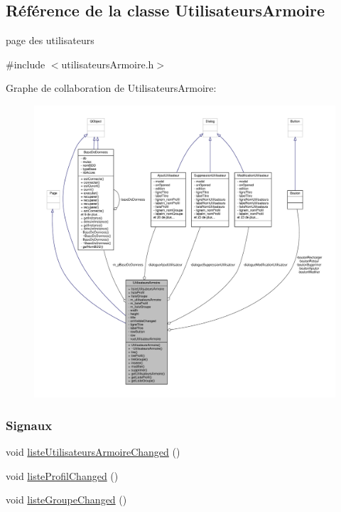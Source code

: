 \hypertarget{class_utilisateurs_armoire}{}\subsection{Référence de la classe Utilisateurs\+Armoire}
\label{class_utilisateurs_armoire}


page des utilisateurs  




{\ttfamily \#include $<$utilisateurs\+Armoire.\+h$>$}



Graphe de collaboration de Utilisateurs\+Armoire\+:\nopagebreak
\begin{figure}[H]
\begin{center}
\leavevmode
\includegraphics[width=350pt]{class_utilisateurs_armoire__coll__graph}
\end{center}
\end{figure}
\subsubsection*{Signaux}
\begin{DoxyCompactItemize}
\item 
void \hyperlink{class_utilisateurs_armoire_ac65c676a1c55c1e04732647188c4ad5b}{liste\+Utilisateurs\+Armoire\+Changed} ()
\item 
void \hyperlink{class_utilisateurs_armoire_a8208260671720fdbd5d6f13b0e6827f2}{liste\+Profil\+Changed} ()
\item 
void \hyperlink{class_utilisateurs_armoire_ae8cbb67d285658aadff801e64f43fd97}{liste\+Groupe\+Changed} ()
\end{DoxyCompactItemize}
